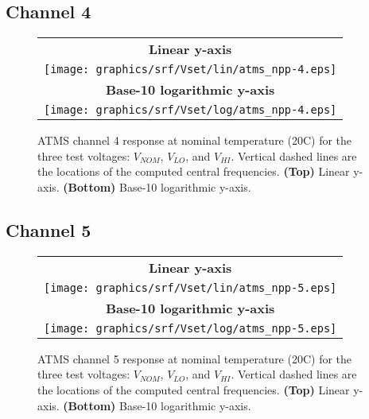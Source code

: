 \subsection{Channel 4}
\begin{figure}[H]
  \label{fig:Vset.ch4_response}
  \centering
  \begin{tabular}{c}
    \hspace{1.75cm}\sffamily\textbf{Linear y-axis} \\
    \texttt{[image: graphics/srf/Vset/lin/atms\_npp-4.eps]} \\
    \hspace{1.75cm}\sffamily\textbf{Base-10 logarithmic y-axis} \\
    \texttt{[image: graphics/srf/Vset/log/atms\_npp-4.eps]}
  \end{tabular}
  \caption{ATMS channel 4 response at nominal temperature (20\textdegree{}C) for the three test voltages: $V_{NOM}$, $V_{LO}$, and $V_{HI}$. Vertical dashed lines are the locations of the computed central frequencies. \textbf{(Top)} Linear y-axis. \textbf{(Bottom)} Base-10 logarithmic y-axis.}
\end{figure}

\subsection{Channel 5}
\begin{figure}[H]
  \label{fig:Vset.ch5_response}
  \centering
  \begin{tabular}{c}
    \hspace{1.75cm}\sffamily\textbf{Linear y-axis} \\
    \texttt{[image: graphics/srf/Vset/lin/atms\_npp-5.eps]} \\
    \hspace{1.75cm}\sffamily\textbf{Base-10 logarithmic y-axis} \\
    \texttt{[image: graphics/srf/Vset/log/atms\_npp-5.eps]}
  \end{tabular}
  \caption{ATMS channel 5 response at nominal temperature (20\textdegree{}C) for the three test voltages: $V_{NOM}$, $V_{LO}$, and $V_{HI}$. Vertical dashed lines are the locations of the computed central frequencies. \textbf{(Top)} Linear y-axis. \textbf{(Bottom)} Base-10 logarithmic y-axis.}
\end{figure}

